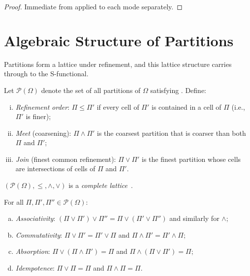 \begin{proof}
Immediate from  applied to each mode separately.
\end{proof}

\section{Algebraic Structure of Partitions}
\label{sec:algebra-structure}

Partitions form a lattice under refinement, and this lattice structure carries
through to the S-functional.

\begin{definition}
\label{def:partition-lattice}
Let $\mathcal{P}(\Omega)$ denote the set of all partitions of $\Omega$
satisfying .  Define:
\begin{enumerate}[(i)]
  \item \emph{Refinement order}: $\Pi \leq \Pi'$ if every cell of $\Pi'$ is
    contained in a cell of $\Pi$ (i.e., $\Pi'$ is finer);
  \item \emph{Meet} (coarsening): $\Pi \wedge \Pi'$ is the coarsest partition
    that is coarser than both $\Pi$ and $\Pi'$;
  \item \emph{Join} (finest common refinement): $\Pi \vee \Pi'$ is the
    finest partition whose cells are intersections of cells of $\Pi$
    and $\Pi'$.
\end{enumerate}
$(\mathcal{P}(\Omega), \leq, \wedge, \vee)$ is a \emph{complete lattice}~\citep{Halmos1950,Billingsley1995}.
\end{definition}

\begin{proposition}
\label{prop:lattice-laws}
For all $\Pi, \Pi', \Pi'' \in \mathcal{P}(\Omega)$:
\begin{enumerate}[(a)]
  \item \emph{Associativity}: $(\Pi \vee \Pi') \vee \Pi'' = \Pi \vee (\Pi' \vee \Pi'')$
    and similarly for $\wedge$;
  \item \emph{Commutativity}: $\Pi \vee \Pi' = \Pi' \vee \Pi$ and
    $\Pi \wedge \Pi' = \Pi' \wedge \Pi$;
  \item \emph{Absorption}: $\Pi \vee (\Pi \wedge \Pi') = \Pi$ and
    $\Pi \wedge (\Pi \vee \Pi') = \Pi$;
  \item \emph{Idempotence}: $\Pi \vee \Pi = \Pi$ and $\Pi \wedge \Pi = \Pi$.
\end{enumerate}
\end{proposition}

